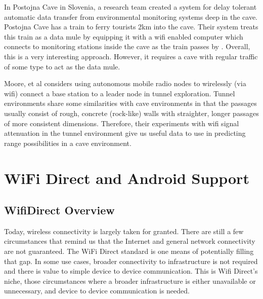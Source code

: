 \documentclass[10pt,twocolumn]{article}
\begin{document}
In Postojna Cave in Slovenia, a research team created a system for delay tolerant automatic data transfer from environmental monitoring systems deep in the cave.
Postojna Cave has a train to ferry tourists 2km into the cave.
Their system treats this train as a data mule by equipping it with a wifi enabled computer which connects to monitoring stations inside the cave as the train passes by \cite{postojna2014}.
Overall, this is a very interesting approach. 
However, it requires a cave with regular traffic of some type to act as the data mule.

Moore, et al \cite{moore2012} considers using autonomous mobile radio nodes to wirelessly (via wifi) connect a base station to a leader node in tunnel exploration. 
Tunnel environments share some similarities with cave environments in that the passages usually consist of rough, concrete (rock-like) walls with straighter, longer passages of more consistent dimensions. 
Therefore, their experiments with wifi signal attenuation in the tunnel environment give us useful data to use in predicting range possibilities in a cave environment.

\section{WiFi Direct and Android Support}

\subsection{WifiDirect Overview}
Today, wireless connectivity is largely taken for granted. 
There are still a few circumstances that remind us that the Internet and general network connectivity are not guaranteed. 
The WiFi Direct standard is one means of potentially filling that gap. 
In some use cases, broader connectivity to infrastructure is not required and there is value to simple device to device communication. 
This is Wifi Direct's niche, those circumstances where a broader infrastructure is either unavailable or unnecessary, and device to device communication is needed.
\end{document}
